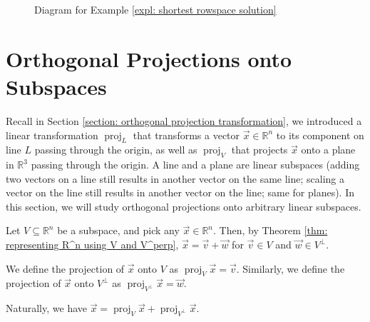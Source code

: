 \documentclass[]{book}
\DeclareMathOperator{\proj}{proj}
\DeclareMathOperator{\image}{Im}
\DeclareMathOperator{\kernel}{Ker}
\newcommand{\mat}[1]{\ensuremath{\mathbf{#1}}}
\newcommand{\R}{\ensuremath{\mathbb{R}}}
\begin{document}
\begin{figure}
    \centering
    \caption{Diagram for Example \ref{expl: shortest rowspace solution}}
    \label{fig: expl: shortest rowspace solution}
\end{figure}
    
\section{Orthogonal Projections onto Subspaces}
Recall in Section \ref{section: orthogonal projection transformation}, we introduced a linear transformation $\proj_L$ that transforms a vector $\vec{x} \in \R^n$ to its component on line $L$ passing through the origin, as well as $\proj_V$ that projects $\vec{x}$ onto a plane in $\R^3$ passing through the origin. A line and a plane are linear subspaces (adding two vectors on a line still results in another vector on the same line; scaling a vector on the line still results in another vector on the line; same for planes). In this section, we will study orthogonal projections onto arbitrary linear subspaces.

\begin{definition}
    \label{defn: orthogonal projection onto a subspace}
    Let $V \subseteq \R^n$ be a subspace, and pick any $\vec{x} \in \R^n$. Then, by Theorem \ref{thm: representing R^n using V and V^perp}, $\vec{x} = \vec{v} + \vec{w}$ for $\vec{v} \in V$ and $\vec{w} \in V^{\perp}$.
    
    We define the projection of $\vec{x}$ onto $V$ as
    $\proj_V \vec{x} = \vec{v}$. Similarly, we define the projection of $\vec{x}$ onto $V^{\perp}$ as $\proj_{V^{\perp}}\vec{x} = \vec{w}$.
    
    Naturally, we have $\vec{x} = \proj_V \vec{x} + \proj_{V^{\perp}}\vec{x}$.
\end{definition}
\end{document}
